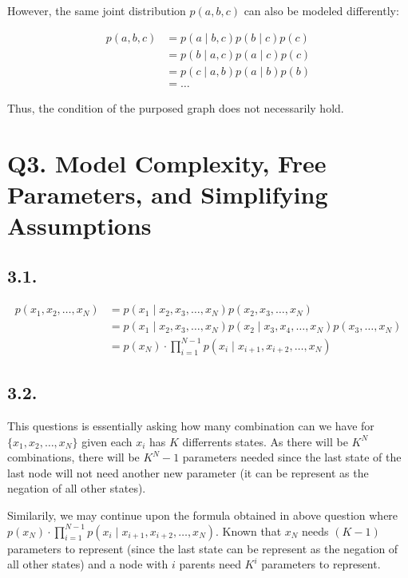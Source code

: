 \documentclass[11pt]{article}
\begin{document}
However, the same joint distribution $p(a, b, c)$ can also be modeled differently:

\begin{align*}
    p(a, b, c) &= p(a \mid b, c)p(b \mid c)p(c) \\
    &= p(b \mid a, c)p(a \mid c)p(c) \\
    &= p(c \mid a, b)p(a \mid b)p(b) \\
    &= \dots
\end{align*}

Thus, the condition of the purposed graph does not necessarily hold.


\section*{Q3. Model Complexity, Free Parameters, and Simplifying Assumptions}

\subsection*{3.1.}

\begin{align*}
    p(x_1, x_2, \dots, x_N) &= p(x_1 \mid x_2, x_3, \dots, x_N) p(x_2, x_3, \dots, x_N) \\
    &= p(x_1 \mid x_2, x_3, \dots, x_N) p(x_2 \mid x_3, x_4, \dots, x_N) p(x_3, \dots, x_N) \\
    &= p(x_N) \cdot \prod_{i = 1}^{N-1} p(x_i \mid x_{i+1},  x_{i+2}, \dots, x_{N})
\end{align*}

\subsection*{3.2.}

This questions is essentially asking how many combination can we have for $\{ x_1, x_2, \dots, x_N \}$ given each $x_i$ has $K$ differrents states. As there will be $K^N$ combinations, there will be $K^N - 1$ parameters needed since the last state of the last node will not need another new parameter (it can be represent as the negation of all other states).

Similarily, we may continue upon the formula obtained in above question where $p(x_N) \cdot \prod_{i = 1}^{N-1} p(x_i \mid x_{i+1},  x_{i+2}, \dots, x_{N})$. Known that $x_N$ needs $(K-1)$ parameters to represent (since the last state can be represent as the negation of all other states) and a node with $i$ parents need $K^i$ parameters to represent.
\end{document}
